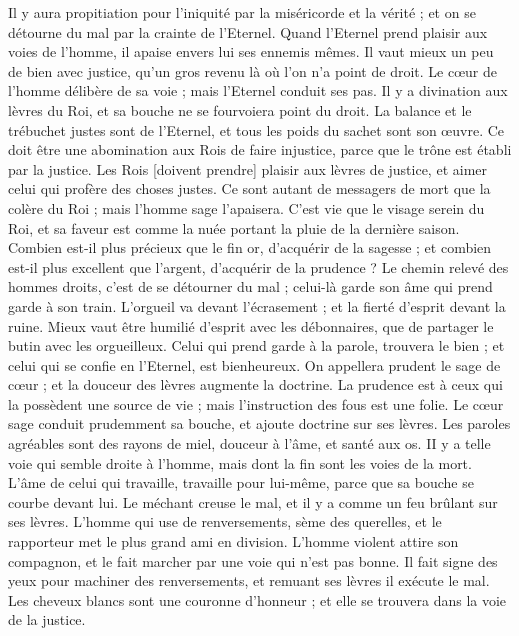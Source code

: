 \begin{multicols}{2}
Il y aura propitiation pour l'iniquité par la miséricorde et la vérité ; et on se détourne du mal par la crainte de l'Eternel.
Quand l'Eternel prend plaisir aux voies de l'homme, il apaise envers lui ses ennemis mêmes.
Il vaut mieux un peu de bien avec justice, qu'un gros revenu là où l'on n'a point de droit.
Le cœur de l'homme délibère de sa voie ; mais l'Eternel conduit ses pas.
Il y a divination aux lèvres du Roi, et sa bouche ne se fourvoiera point du droit.
La balance et le trébuchet justes sont de l'Eternel, et tous les poids du sachet sont son œuvre.
Ce doit être une abomination aux Rois de faire injustice, parce que le trône est établi par la justice.
Les Rois [doivent prendre] plaisir aux lèvres de justice, et aimer celui qui profère des choses justes.
Ce sont autant de messagers de mort que la colère du Roi ; mais l'homme sage l'apaisera.
C'est vie que le visage serein du Roi, et sa faveur est comme la nuée portant la pluie de la dernière saison.
Combien est-il plus précieux que le fin or, d'acquérir de la sagesse ; et combien est-il plus excellent que l'argent, d'acquérir de la prudence ?
Le chemin relevé des hommes droits, c'est de se détourner du mal ; celui-là garde son âme qui prend garde à son train.
L'orgueil va devant l'écrasement ; et la fierté d'esprit devant la ruine.
Mieux vaut être humilié d'esprit avec les débonnaires, que de partager le butin avec les orgueilleux.
Celui qui prend garde à la parole, trouvera le bien ; et celui qui se confie en l'Eternel, est bienheureux.
On appellera prudent le sage de cœur ; et la douceur des lèvres augmente la doctrine.
La prudence est à ceux qui la possèdent une source de vie ; mais l'instruction des fous est une folie.
Le cœur sage conduit prudemment sa bouche, et ajoute doctrine sur ses lèvres.
Les paroles agréables sont des rayons de miel, douceur à l'âme, et santé aux os.
II y a telle voie qui semble droite à l'homme, mais dont la fin sont les voies de la mort.
L'âme de celui qui travaille, travaille pour lui-même, parce que sa bouche se courbe devant lui.
Le méchant creuse le mal, et il y a comme un feu brûlant sur ses lèvres.
L'homme qui use de renversements, sème des querelles, et le rapporteur met le plus grand ami en division.
L'homme violent attire son compagnon, et le fait marcher par une voie qui n'est pas bonne.
Il fait signe des yeux pour machiner des renversements, et remuant ses lèvres il exécute le mal.
Les cheveux blancs sont une couronne d'honneur ; et elle se trouvera dans la voie de la justice.

\end{multicols}
